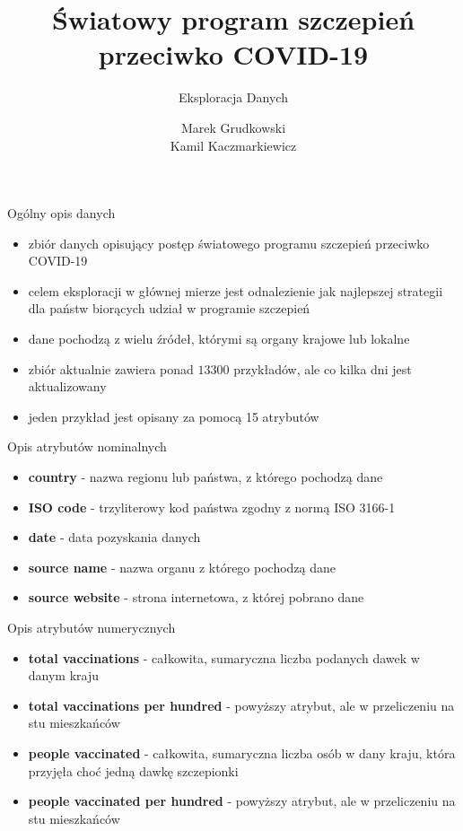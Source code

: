 \documentclass[11pt]{beamer}
\author{Marek Grudkowski \\ Kamil Kaczmarkiewicz}
\title{Światowy program szczepień \\ przeciwko COVID-19}
\subtitle{Eksploracja Danych}
\institute{Politechnika Gdańska}
\date{}
\begin{document}
\begin{frame}
\titlepage
\end{frame}


\begin{frame}{Ogólny opis danych}
\begin{itemize}
\item zbiór danych opisujący postęp światowego programu szczepień przeciwko COVID-19
\item celem eksploracji w głównej mierze jest odnalezienie jak najlepszej strategii dla państw biorących udział w programie szczepień
\item dane pochodzą z wielu źródeł, którymi są organy krajowe lub lokalne
\item zbiór aktualnie zawiera ponad $13300$ przykładów, ale co kilka dni jest aktualizowany
\item jeden przykład jest opisany za pomocą 15 atrybutów
\end{itemize}
\end{frame}

\begin{frame}{Opis atrybutów nominalnych}
\begin{itemize}
\item \textbf{country} - nazwa regionu lub państwa, z którego pochodzą dane
\item \textbf{ISO code} - trzyliterowy kod państwa zgodny z normą  ISO 3166-1
\item \textbf{date} - data pozyskania danych
\item \textbf{source name} - nazwa organu z którego pochodzą dane
\item \textbf{source website} - strona internetowa, z której pobrano dane
\end{itemize}
\end{frame}

\begin{frame}{Opis atrybutów numerycznych}
\begin{itemize}
	\item \textbf{total vaccinations} - całkowita, sumaryczna liczba podanych dawek w danym kraju
	\item \textbf{total vaccinations per hundred} - powyższy atrybut, ale w przeliczeniu na stu mieszkańców
	\item \textbf{people vaccinated} - całkowita, sumaryczna liczba osób w dany kraju, która przyjęła choć jedną dawkę szczepionki
	\item \textbf{people vaccinated per hundred} - powyższy atrybut, ale w przeliczeniu na stu mieszkańców
\end{itemize}
\end{frame}
\end{document}
